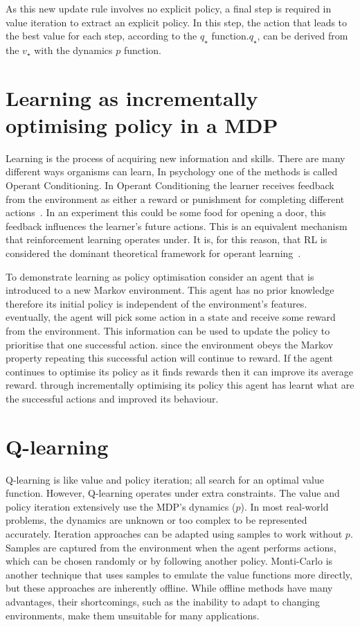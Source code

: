 \documentclass[]{final_report}
\begin{document}
As this new update rule involves no explicit policy, a final step is required in value iteration to extract an explicit policy. In this step, the action that leads to the best value for each step, according to the $q_\star$ function.$q_\star$, can be derived from the $v_\star$ with the dynamics $p$ function.


\section{Learning as incrementally optimising policy in a MDP}

Learning is the process of acquiring new information and skills. There are many different ways organisms can learn, In psychology one of the methods is called Operant Conditioning. In Operant Conditioning the learner receives feedback from the environment as either a reward or punishment for completing different actions~\cite{staddon2003operant}. In an experiment this could be some food for opening a door, this feedback influences the learner's future actions. This is an equivalent mechanism that reinforcement learning operates under. It is, for this reason, that RL is considered the dominant theoretical framework for operant learning~\cite{shteingart2014reinforcement}. 

To demonstrate learning as policy optimisation consider an agent that is introduced to a new Markov environment. This agent has no prior knowledge therefore its initial policy is independent of the environment's features. eventually, the agent will pick some action in a state and receive some reward from the environment. This information can be used to update the policy to prioritise that one successful action. since the environment obeys the Markov property repeating this successful action will continue to reward. If the agent continues to optimise its policy as it finds rewards then it can improve its average reward. through incrementally optimising its policy this agent has learnt what are the successful actions and improved its behaviour.



\section{Q-learning}\label{chap:q-learning}


Q-learning is like value and policy iteration; all search for an optimal value function. However, Q-learning operates under extra constraints. The value and policy iteration extensively use the MDP's dynamics ($p$). In most real-world problems, the dynamics are unknown or too complex to be represented accurately. Iteration approaches can be adapted using samples to work without $p$. Samples are captured from the environment when the agent performs actions, which can be chosen randomly or by following another policy. Monti-Carlo is another technique that uses samples to emulate the value functions more directly, but these approaches are inherently offline. While offline methods have many advantages, their shortcomings, such as the inability to adapt to changing environments, make them unsuitable for many applications. 
\end{document}
